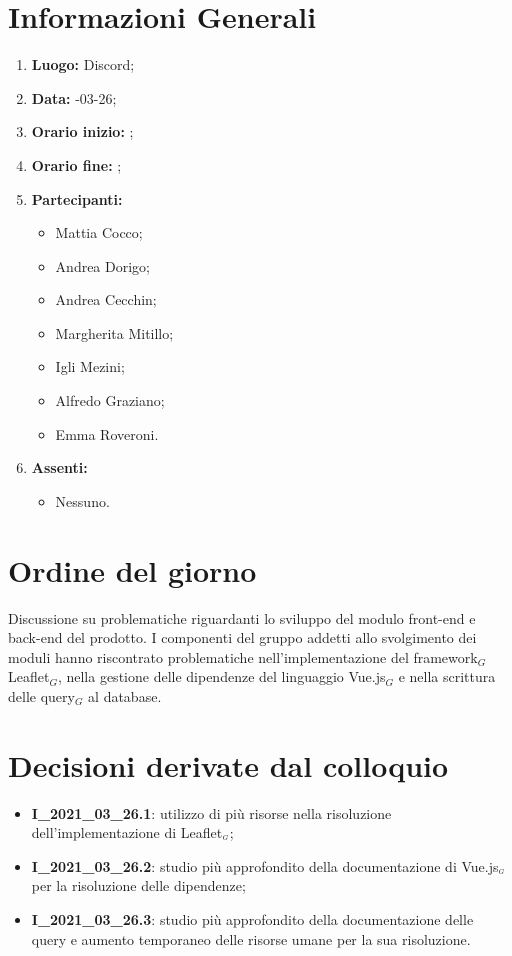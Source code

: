 \newpage
\section{Informazioni Generali}
\begin{enumerate}
	\item \textbf{Luogo:} \normalfont  Discord;
	\item \textbf{Data:} -03-26;
	\item \textbf{Orario inizio:} ;
	\item \textbf{Orario fine:} ;
	\item \textbf{Partecipanti:}
	\begin{itemize}
		\item Mattia Cocco;
		\item Andrea Dorigo;
		\item Andrea Cecchin;
		\item Margherita Mitillo;
		\item Igli Mezini;
		\item Alfredo Graziano;
		\item Emma Roveroni.
	\end{itemize}
	\item \textbf{Assenti:}
	\begin{itemize}
		\item Nessuno.
	\end{itemize}
\end{enumerate}
\section{Ordine del giorno}
Discussione su problematiche riguardanti lo sviluppo del modulo front-end e back-end del prodotto. I componenti del gruppo addetti allo svolgimento dei moduli hanno riscontrato problematiche nell'implementazione del framework$_G$ Leaflet$_G$, nella gestione delle dipendenze del linguaggio Vue.js$_G$ e nella scrittura delle query$_G$ al database.

\section{Decisioni derivate dal colloquio}
\begin{itemize}
	\item \textbf{I\_2021\_03\_26.1}: utilizzo di più risorse nella risoluzione dell'implementazione di Leaflet$_{\scaleto{G}{3pt}}$;
	\item \textbf{I\_2021\_03\_26.2}: studio più approfondito della documentazione di Vue.js$_{\scaleto{G}{3pt}}$ per la risoluzione delle dipendenze;
	\item \textbf{I\_2021\_03\_26.3}: studio più approfondito della documentazione delle query e aumento temporaneo delle risorse umane per la sua risoluzione.
\end{itemize}